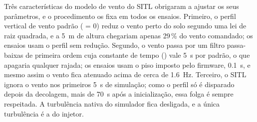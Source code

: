 Três características do modelo de vento do SITL obrigaram a ajustar os seus
parâmetros, e o procedimento os fixa em todos os ensaios. Primeiro, o perfil
vertical de vento padrão ( = 0) reduz o vento perto do
solo segundo uma lei de raiz quadrada, e a \SI{5}{\metre} de altura chegariam
apenas 29\,\% do vento comandado; os ensaios usam o perfil sem redução.
Segundo, o vento passa por um filtro passa-baixas de primeira ordem cuja
constante de tempo () vale \SI{5}{\second} por padrão,
o que apagaria qualquer rajada; os ensaios usam o piso imposto pelo firmware,
\SI{0.1}{\second}, e mesmo assim o vento fica atenuado acima de cerca de
\SI{1.6}{\hertz}. Terceiro, o SITL ignora o vento
nos primeiros \SI{5}{\second} de simulação; como o perfil só é disparado
depois da decolagem, mais de \SI{70}{\second} após a inicialização, essa
folga é sempre respeitada. A turbulência nativa do simulador fica desligada,
e a única turbulência é a do injetor.
